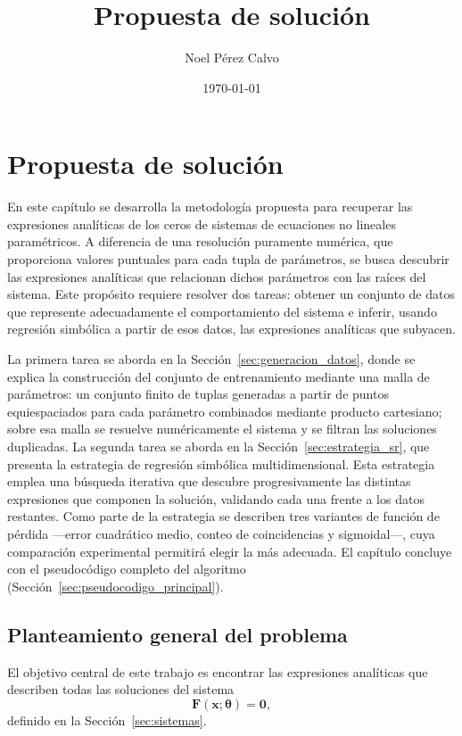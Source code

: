\documentclass{article} \usepackage[utf8]{inputenc} \usepackage[spanish]{babel} \spanishdecimal{.} \usepackage{amsmath, amssymb, amsthm} \usepackage{bm} \usepackage{float} \usepackage{longtable} \usepackage[hidelinks]{hyperref}
\title{Propuesta de solución} \author{Noel Pérez Calvo} \date{\today}
\newcommand{\xvec}{\mathbf{x}} \newcommand{\thetavec}{\boldsymbol{\theta}} \newcommand{\Fvec}{\mathbf{F}} \newcommand{\R}{\mathbb{R}} \newcommand{\norm}[1]{\left\lVert#1\right\rVert} \newcommand{\loss}{\mathcal{L}} \newcommand{\dataset}{\mathcal{D}} \newcommand{\jac}{\mathbf{J}}
\begin{document}
\maketitle

\section{Propuesta de solución}
\label{sec:propuesta}

En este capítulo se desarrolla la metodología propuesta para recuperar
las expresiones analíticas de los ceros de sistemas de ecuaciones no
lineales paramétricos. A diferencia de una resolución puramente
numérica, que proporciona valores puntuales para cada tupla de
parámetros, se busca descubrir las expresiones analíticas que
relacionan dichos parámetros con las raíces del sistema. Este
propósito requiere resolver dos tareas: obtener un conjunto de datos
que represente adecuadamente el comportamiento del sistema e inferir,
usando regresión simbólica a partir de esos datos, las expresiones
analíticas que subyacen.

La primera tarea se aborda en la
Sección~\ref{sec:generacion_datos}, donde se explica la construcción
del conjunto de entrenamiento mediante una malla de parámetros: un
conjunto finito de tuplas generadas a partir de puntos equiespaciados
para cada parámetro combinados mediante producto cartesiano; sobre
esa malla se resuelve numéricamente el sistema y se filtran las
soluciones duplicadas. La segunda tarea se aborda en la
Sección~\ref{sec:estrategia_sr}, que presenta la estrategia de
regresión simbólica multidimensional. Esta estrategia emplea una
búsqueda iterativa que descubre progresivamente las distintas
expresiones que componen la solución, validando cada una frente a los
datos restantes. Como parte de la estrategia se describen tres
variantes de función de pérdida —error cuadrático medio, conteo de
coincidencias y sigmoidal—, cuya comparación experimental permitirá
elegir la más adecuada. El capítulo concluye con el pseudocódigo
completo del algoritmo (Sección~\ref{sec:pseudocodigo_principal}).

\subsection{Planteamiento general del problema}
\label{sec:planteamiento}

El objetivo central de este trabajo es encontrar las expresiones
analíticas que describen todas las soluciones del sistema
\begin{equation}
\Fvec(\xvec; \thetavec) = \mathbf{0},
\label{eq:problema_original}
\end{equation}
definido en la Sección~\ref{sec:sistemas}.
\end{document}
